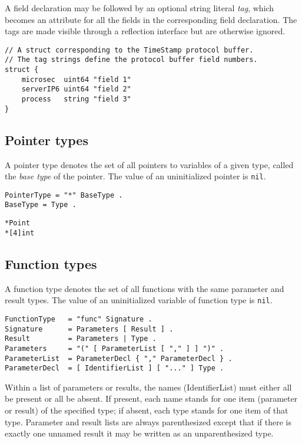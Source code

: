 {A field declaration may be followed by an optional string literal
\emph{tag}, which becomes an attribute for all the fields in the
corresponding field declaration. The tags are made visible through a
reflection interface but are otherwise
ignored.

\begin{Verbatim}[frame=single]
// A struct corresponding to the TimeStamp protocol buffer.
// The tag strings define the protocol buffer field numbers.
struct {
    microsec  uint64 "field 1"
    serverIP6 uint64 "field 2"
    process   string "field 3"
}
\end{Verbatim}

\subsection*{Pointer types}

A pointer type denotes the set of all pointers to variables of a given
type, called the \emph{base type} of the pointer. The value of an
uninitialized pointer is \texttt{nil}.

\begin{Verbatim}[frame=single]
PointerType = "*" BaseType .
BaseType = Type .
\end{Verbatim}

\begin{Verbatim}[frame=single]
*Point
*[4]int
\end{Verbatim}

\subsection*{Function types}

A function type denotes the set of all functions with the same parameter
and result types. The value of an uninitialized variable of function
type is \texttt{nil}.

\begin{Verbatim}[frame=single]
FunctionType   = "func" Signature .
Signature      = Parameters [ Result ] .
Result         = Parameters | Type .
Parameters     = "(" [ ParameterList [ "," ] ] ")" .
ParameterList  = ParameterDecl { "," ParameterDecl } .
ParameterDecl  = [ IdentifierList ] [ "..." ] Type .
\end{Verbatim}

Within a list of parameters or results, the names (IdentifierList) must
either all be present or all be absent. If present, each name stands for
one item (parameter or result) of the specified type; if absent, each
type stands for one item of that type. Parameter and result lists are
always parenthesized except that if there is exactly one unnamed result
it may be written as an unparenthesized type.

}

